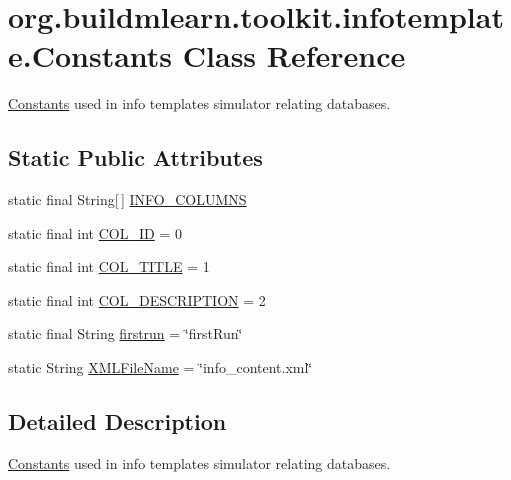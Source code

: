 \hypertarget{classorg_1_1buildmlearn_1_1toolkit_1_1infotemplate_1_1Constants}{}\section{org.\+buildmlearn.\+toolkit.\+infotemplate.\+Constants Class Reference}
\label{classorg_1_1buildmlearn_1_1toolkit_1_1infotemplate_1_1Constants}


\hyperlink{classorg_1_1buildmlearn_1_1toolkit_1_1infotemplate_1_1Constants}{Constants} used in info template\textquotesingle{}s simulator relating databases.  


\subsection*{Static Public Attributes}
\begin{DoxyCompactItemize}
\item 
static final String\mbox{[}$\,$\mbox{]} \hyperlink{classorg_1_1buildmlearn_1_1toolkit_1_1infotemplate_1_1Constants_ae6b2c8cbf31d03d1b293d88c4b9ac24d}{I\+N\+F\+O\+\_\+\+C\+O\+L\+U\+M\+NS}
\item 
static final int \hyperlink{classorg_1_1buildmlearn_1_1toolkit_1_1infotemplate_1_1Constants_ad45dc3bd5034af8e36d33d6f229623f5}{C\+O\+L\+\_\+\+ID} = 0
\item 
static final int \hyperlink{classorg_1_1buildmlearn_1_1toolkit_1_1infotemplate_1_1Constants_a177c5e5227104174b6425ce1e4bb171a}{C\+O\+L\+\_\+\+T\+I\+T\+LE} = 1
\item 
static final int \hyperlink{classorg_1_1buildmlearn_1_1toolkit_1_1infotemplate_1_1Constants_ab0ddba830d28c3ee64133f2711ba8531}{C\+O\+L\+\_\+\+D\+E\+S\+C\+R\+I\+P\+T\+I\+ON} = 2
\item 
static final String \hyperlink{classorg_1_1buildmlearn_1_1toolkit_1_1infotemplate_1_1Constants_a242441fcf44f87ab805d170502d632d4}{firstrun} = \char`\"{}first\+Run\char`\"{}
\item 
static String \hyperlink{classorg_1_1buildmlearn_1_1toolkit_1_1infotemplate_1_1Constants_a6e52222033a5037d1a0150911ad0d793}{X\+M\+L\+File\+Name} = \char`\"{}info\+\_\+content.\+xml\char`\"{}
\end{DoxyCompactItemize}


\subsection{Detailed Description}
\hyperlink{classorg_1_1buildmlearn_1_1toolkit_1_1infotemplate_1_1Constants}{Constants} used in info template\textquotesingle{}s simulator relating databases. 

